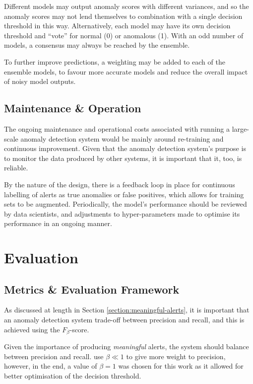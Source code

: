 \documentclass{mpaper}
\begin{document}
Different models may output anomaly scores with different variances, and so the anomaly scores may not lend themselves to combination with a single decision threshold in this way. Alternatively, each model may have its own decision threshold and ``vote'' for normal (0) or anomalous (1). With an odd number of models, a consensus may always be reached by the ensemble.

To further improve predictions, a weighting may be added to each of the ensemble models, to favour more accurate models and reduce the overall impact of noisy model outputs.


\subsection{Maintenance \& Operation}

The ongoing maintenance and operational costs associated with running a large-scale anomaly detection system would be mainly around re-training and continuous improvement. Given that the anomaly detection system's purpose is to monitor the data produced by other systems, it is important that it, too, is reliable.

By the nature of the design, there is a feedback loop in place for continuous labelling of alerts as true anomalies or false positives, which allows for training sets to be augmented. Periodically, the model's performance should be reviewed by data scientists, and adjustments to hyper-parameters made to optimise its performance in an ongoing manner.

\section{Evaluation}
\label{section:evaluation}

\subsection{Metrics \& Evaluation Framework}
\label{section:evaluation-metrics-framework}

As discussed at length in Section \ref{section:meaningful-alerts}, it is important that an anomaly detection system trade-off between precision and recall, and this is achieved using the $F_\beta$-score.

Given the importance of producing \textit{meaningful} alerts, the system should balance between precision and recall. 
\cite{lstmTimeSeriesAnomalyDetection} use $\beta \ll 1$ to give more weight to precision, however, in the end, a value of $\beta = 1$ was chosen for this work as it allowed for better optimisation of the decision threshold.
\end{document}
